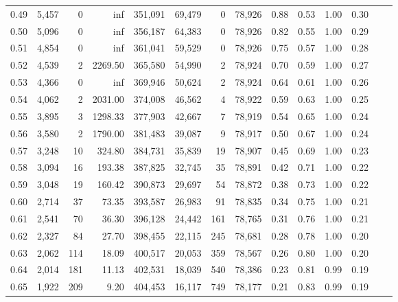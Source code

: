 \begin{tabular}{rrrrrrrrrrrrrr}
0.49 &  5,457 &      0 &      inf &  351,091 &   69,479 &       0 &  78,926 &  0.88 &  0.53 &  1.00 &      0.30 \\
0.50 &  5,096 &      0 &      inf &  356,187 &   64,383 &       0 &  78,926 &  0.82 &  0.55 &  1.00 &      0.29 \\
0.51 &  4,854 &      0 &      inf &  361,041 &   59,529 &       0 &  78,926 &  0.75 &  0.57 &  1.00 &      0.28 \\
0.52 &  4,539 &      2 &  2269.50 &  365,580 &   54,990 &       2 &  78,924 &  0.70 &  0.59 &  1.00 &      0.27 \\
0.53 &  4,366 &      0 &      inf &  369,946 &   50,624 &       2 &  78,924 &  0.64 &  0.61 &  1.00 &      0.26 \\
0.54 &  4,062 &      2 &  2031.00 &  374,008 &   46,562 &       4 &  78,922 &  0.59 &  0.63 &  1.00 &      0.25 \\
0.55 &  3,895 &      3 &  1298.33 &  377,903 &   42,667 &       7 &  78,919 &  0.54 &  0.65 &  1.00 &      0.24 \\
0.56 &  3,580 &      2 &  1790.00 &  381,483 &   39,087 &       9 &  78,917 &  0.50 &  0.67 &  1.00 &      0.24 \\
0.57 &  3,248 &     10 &   324.80 &  384,731 &   35,839 &      19 &  78,907 &  0.45 &  0.69 &  1.00 &      0.23 \\
0.58 &  3,094 &     16 &   193.38 &  387,825 &   32,745 &      35 &  78,891 &  0.42 &  0.71 &  1.00 &      0.22 \\
0.59 &  3,048 &     19 &   160.42 &  390,873 &   29,697 &      54 &  78,872 &  0.38 &  0.73 &  1.00 &      0.22 \\
0.60 &  2,714 &     37 &    73.35 &  393,587 &   26,983 &      91 &  78,835 &  0.34 &  0.75 &  1.00 &      0.21 \\
0.61 &  2,541 &     70 &    36.30 &  396,128 &   24,442 &     161 &  78,765 &  0.31 &  0.76 &  1.00 &      0.21 \\
0.62 &  2,327 &     84 &    27.70 &  398,455 &   22,115 &     245 &  78,681 &  0.28 &  0.78 &  1.00 &      0.20 \\
0.63 &  2,062 &    114 &    18.09 &  400,517 &   20,053 &     359 &  78,567 &  0.26 &  0.80 &  1.00 &      0.20 \\
0.64 &  2,014 &    181 &    11.13 &  402,531 &   18,039 &     540 &  78,386 &  0.23 &  0.81 &  0.99 &      0.19 \\
0.65 &  1,922 &    209 &     9.20 &  404,453 &   16,117 &     749 &  78,177 &  0.21 &  0.83 &  0.99 &      0.19 \\

\end{tabular}
